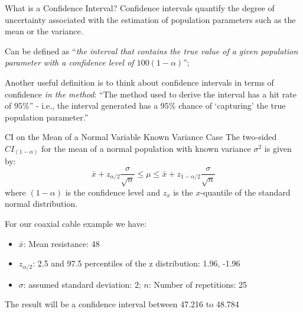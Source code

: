 
\begin{frame}{What is a Confidence Interval?}
Confidence intervals quantify the degree of uncertainty associated with the estimation of population parameters such as the mean or the variance.\bigskip

Can be defined as ``\textit{the interval that contains the true value of a given population parameter with a confidence level of $100(1-\alpha)$}'';\bigskip

Another useful definition is to think about confidence intervals in terms of confidence \textit{in the method}: ``The method used to derive the interval has a hit rate of $95\%$'' - i.e., the interval generated has a $95\%$ chance of `capturing' the true population parameter.''
\end{frame}





\begin{frame}[t]{CI on the Mean of a Normal Variable}
  {Known Variance Case}
The two-sided $CI_{(1-\alpha)}$ for the mean of a normal population with known variance $\sigma^2$ is given by:
\begin{equation*}
\bar{x}+z_{\alpha/2}\frac{\sigma}{\sqrt{n}}\leq\mu\leq\bar{x}+z_{1-\alpha/2}\frac{\sigma}{\sqrt{n}}
\end{equation*}
\noindent where $(1-\alpha)$ is the confidence level and $z_{x}$ is the $x$-quantile of the standard normal distribution.
\bigskip

For our coaxial cable example we have:
\begin{itemize}
  \item $\bar{x}$: Mean resistance: 48
  \item $z_{\alpha/2}$: 2.5 and 97.5 percentiles of the z distribution: 1.96, -1.96
  \item $\sigma$: assumed standard deviation: 2; $n$: Number of repetitions: 25
\end{itemize}\medskip

The result will be a confidence interval between 47.216 to 48.784
\end{frame}


